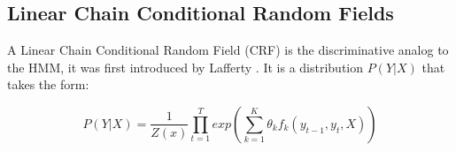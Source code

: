 \documentclass{nle}
\begin{document}
% 
% 
% 

\subsection{Linear Chain Conditional Random Fields}

A Linear Chain Conditional Random Field (CRF) is the discriminative analog to the HMM,
it was first introduced by Lafferty \cite{Lafferty2001}. It is a distribution $ P(Y|X) $ that takes the form:

\begin{equation}
P(Y|X) = \frac{1}{Z(x)} \prod_{t=1}^{T} exp \left( \sum_{k=1}^{K} \theta_k f_k(y_{t-1}, y_t, X) \right)
\end{equation}
\\
\end{document}
